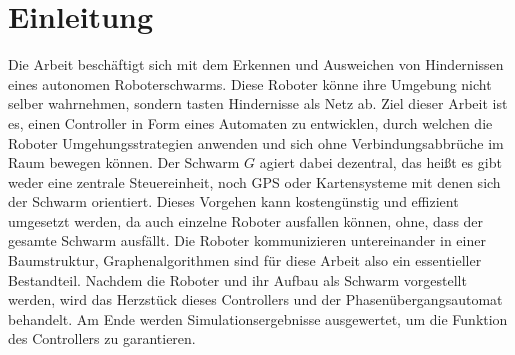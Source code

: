 \section{Einleitung}

Die Arbeit beschäftigt sich mit dem Erkennen und Ausweichen von Hindernissen eines autonomen 
Roboterschwarms. Diese Roboter könne ihre Umgebung nicht selber wahrnehmen, sondern tasten Hindernisse als
Netz ab. Ziel dieser Arbeit ist es, einen Controller in Form eines Automaten zu entwicklen, durch welchen
die Roboter Umgehungsstrategien anwenden und sich ohne Verbindungsabbrüche im Raum bewegen können. Der
Schwarm $G$ agiert dabei dezentral, das heißt es gibt weder eine zentrale Steuereinheit, noch GPS oder 
Kartensysteme mit denen sich der Schwarm orientiert. Dieses Vorgehen kann kostengünstig und effizient
umgesetzt werden, da auch einzelne Roboter ausfallen können, ohne, dass der gesamte Schwarm ausfällt. Die
Roboter kommunizieren untereinander in einer Baumstruktur, Graphenalgorithmen sind für diese Arbeit also
ein essentieller Bestandteil. Nachdem die Roboter und ihr Aufbau als Schwarm vorgestellt werden, wird das
Herzstück dieses Controllers und der Phasenübergangsautomat behandelt. Am Ende werden Simulationsergebnisse
ausgewertet, um die Funktion des Controllers zu garantieren.